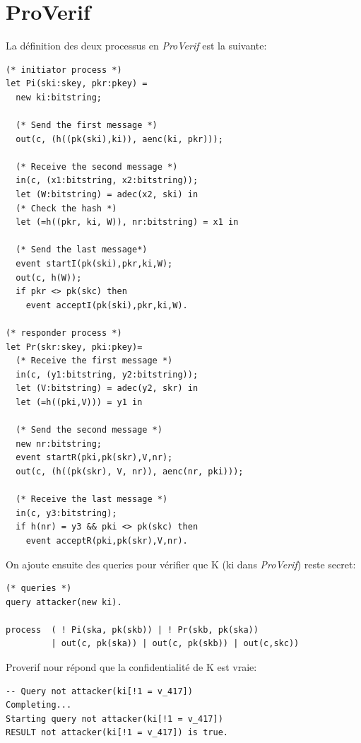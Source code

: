 \documentclass[10pt,a4paper]{article}
\begin{document}
\section{ProVerif}
La définition des deux processus en \textit{ProVerif} est la suivante:
\begin{Verbatim}[fontsize=\scriptsize]
(* initiator process *)
let Pi(ski:skey, pkr:pkey) = 
  new ki:bitstring;

  (* Send the first message *)
  out(c, (h((pk(ski),ki)), aenc(ki, pkr)));

  (* Receive the second message *)
  in(c, (x1:bitstring, x2:bitstring));
  let (W:bitstring) = adec(x2, ski) in
  (* Check the hash *)
  let (=h((pkr, ki, W)), nr:bitstring) = x1 in

  (* Send the last message*)
  event startI(pk(ski),pkr,ki,W);
  out(c, h(W));
  if pkr <> pk(skc) then
    event acceptI(pk(ski),pkr,ki,W). 

(* responder process *)
let Pr(skr:skey, pki:pkey)=
  (* Receive the first message *)
  in(c, (y1:bitstring, y2:bitstring));
  let (V:bitstring) = adec(y2, skr) in
  let (=h((pki,V))) = y1 in

  (* Send the second message *)
  new nr:bitstring;
  event startR(pki,pk(skr),V,nr);
  out(c, (h((pk(skr), V, nr)), aenc(nr, pki)));

  (* Receive the last message *)
  in(c, y3:bitstring);
  if h(nr) = y3 && pki <> pk(skc) then
    event acceptR(pki,pk(skr),V,nr).
\end{Verbatim}

On ajoute ensuite des queries pour vérifier que K (ki dans \textit{ProVerif}) reste secret:
\begin{Verbatim}[fontsize=\scriptsize]
(* queries *)
query attacker(new ki).

process  ( ! Pi(ska, pk(skb)) | ! Pr(skb, pk(ska))
         | out(c, pk(ska)) | out(c, pk(skb)) | out(c,skc))
\end{Verbatim}
Proverif nour répond que la confidentialité de K est vraie:
\begin{Verbatim}[fontsize=\scriptsize]
-- Query not attacker(ki[!1 = v_417])
Completing...
Starting query not attacker(ki[!1 = v_417])
RESULT not attacker(ki[!1 = v_417]) is true.
\end{Verbatim}
\end{document}
